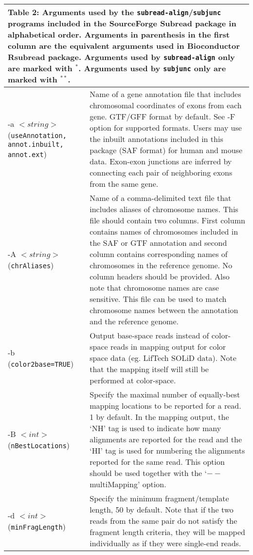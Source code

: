 \documentclass[12pt]{report}
\newcommand{\code}[1]{{\small\texttt{#1}}}
\newcommand{\Subread}{\textsf{Subread}}
\newcommand{\Rsubread}{\textsf{Rsubread}}
\begin{document}
\begin{longtable}{|p{4cm}|p{12cm}|}
\multicolumn{2}{p{16cm}}{Table 2: Arguments used by the \code{subread-align}/\code{subjunc} programs included in the SourceForge {\Subread} package in alphabetical order.
Arguments in parenthesis in the first column are the equivalent arguments used in Bioconductor {\Rsubread} package.
Arguments used by \code{subread-align} only are marked with $^*$.
Arguments used by \code{subjunc} only are marked with $^{**}$.
\newline
}
\endfirsthead
\hline
Arguments & Description \\
\hline
-a $<string>$\newline (\code{useAnnotation, annot.inbuilt, annot.ext}) & Name of a gene annotation file that includes chromosomal coordinates of exons from each gene. GTF/GFF format by default. See -F option for supported formats. Users may use the inbuilt annotations included in this package (SAF format) for human and mouse data. Exon-exon junctions are inferred by connecting each pair of neighboring exons from the same gene.\\
\hline
-A $<string>$\newline (\code{chrAliases}) & Name of a comma-delimited text file that includes aliases of chromosome names. This file should contain two columns. First column contains names of chromosomes included in the SAF or GTF annotation and second column contains corresponding names of chromosomes in the reference genome. No column headers should be provided. Also note that chromosome names are case sensitive. This file can be used to match chromosome names between the annotation and the reference genome.\\
\hline
-b \newline (\code{color2base=TRUE}) & Output base-space reads instead of color-space reads in mapping output for color space data (eg. LifTech SOLiD data). Note that the mapping itself will still be performed at color-space.\\
\hline
-B $<int>$ \newline (\code{nBestLocations}) & Specify the maximal number of equally-best mapping locations to be reported for a read. 1 by default.  In the mapping output, the `NH' tag is used to indicate how many alignments are reported for the read and the `HI' tag is used for numbering the alignments reported for the same read. This option should be used together with the `$--$multiMapping' option.  \\
\hline
-d $<int>$ \newline (\code{minFragLength}) & Specify the minimum fragment/template length, 50 by default.  Note that if the two reads from the same pair do not satisfy the fragment length criteria, they will be mapped individually as if they were single-end reads.\\

\end{longtable}
\end{document}
